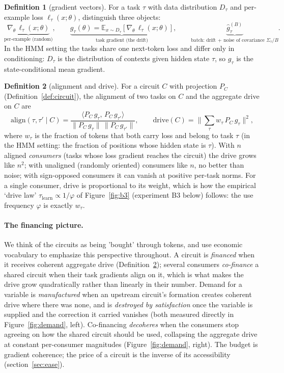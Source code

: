 \documentclass[10pt]{article}
\theoremstyle{definition}
\newtheorem{definition}{Definition}
\begin{document}
\begin{definition}[gradient vectors]\label{def:grads}
For a task $\tau$ with data distribution $D_\tau$ and per-example loss $\ell_\tau(x;\theta)$, distinguish three objects:
$$\underbrace{\nabla_\theta\, \ell_\tau(x;\theta)}_{\text{per-example (random)}}, \qquad
\underbrace{g_\tau(\theta) = \mathbb{E}_{x\sim D_\tau}\!\left[\nabla_\theta\, \ell_\tau(x;\theta)\right]}_{\text{task gradient (the drift)}}, \qquad
\underbrace{\hat g^{(B)}_\tau}_{\text{batch: drift} \,+\, \text{noise of covariance } \Sigma_\tau/B}.$$
In the HMM setting the tasks share one next-token loss and differ only in conditioning: $D_\tau$ is the distribution of contexts given hidden state $\tau$, so $g_\tau$ is the state-conditional mean gradient.
\end{definition}

\begin{definition}[alignment and drive]\label{def:align}
For a circuit $C$ with projection $P_C$ (Definition~\ref{def:circuit}), the alignment of two tasks on $C$ and the aggregate drive on $C$ are
$$\mathrm{align}(\tau,\tau' \mid C) = \frac{\langle P_C\, g_\tau,\, P_C\, g_{\tau'}\rangle}{\|P_C\, g_\tau\|\, \|P_C\, g_{\tau'}\|},
\qquad
\mathrm{drive}(C) = \Big\| \sum_\tau w_\tau\, P_C\, g_\tau \Big\|^2,$$
where $w_\tau$ is the fraction of tokens that both carry loss and belong to task $\tau$ (in the HMM setting: the fraction of positions whose hidden state is $\tau$). With $n$ aligned \emph{consumers} (tasks whose loss gradient reaches the circuit) the drive grows like $n^2$; with unaligned (randomly oriented) consumers like $n$, no better than noise; with sign-opposed consumers it can vanish at positive per-task norms. For a single consumer, drive is proportional to its weight, which is how the empirical `drive law' $\tau_{\text{learn}} \propto 1/\varphi$ of Figure~\ref{fig:b3} (experiment B3 below) follows: the use frequency $\varphi$ is exactly $w_\tau$.
\end{definition}

\paragraph{The financing picture.} We think of the circuits as being 'bought' through tokens, and use economic vocabulary to emphasize this perspective throughout. A circuit is \emph{financed} when it receives coherent aggregate drive (Definition~\ref{def:align}); several consumers \emph{co-finance} a shared circuit when their task gradients align on it, which is what makes the drive grow quadratically rather than linearly in their number. Demand for a variable is \emph{manufactured} when an upstream circuit's formation creates coherent drive where there was none, and is \emph{destroyed by satisfaction} once the variable is supplied and the correction it carried vanishes (both measured directly in Figure~\ref{fig:demand}, left). Co-financing \emph{decoheres} when the consumers stop agreeing on how the shared circuit should be used, collapsing the aggregate drive at constant per-consumer magnitudes (Figure~\ref{fig:demand}, right). The budget is gradient coherence; the price of a circuit is the inverse of its accessibility (section~\ref{sec:ease}).
\end{document}
